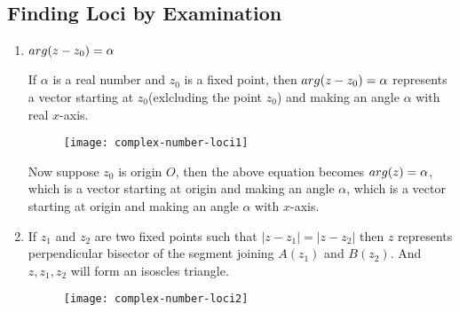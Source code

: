\subsection{Finding Loci by Examination}
\begin{enumerate}
\item $\\arg(z - z_0) = \alpha$

  If $\alpha$ is a real number and $z_0$ is a fixed point, then $\\arg(z - z_0) =\alpha$ represents a vector starting at
  $z_0$(exlcluding  the point $z_0$) and making an angle $\alpha$ with real $x$-axis.
  \begin{figure}[h]
    \begin{center}
      \texttt{[image: complex-number-loci1]}
    \end{center}
  \end{figure}

  Now suppose $z_0$ is origin $O$, then the above equation becomes $\\arg(z) = \alpha$, which is a vector starting at origin and
  making an angle $\alpha$, which is a vector starting at origin and making an angle $\alpha$ with $x$-axis.
\item If $z_1$ and $z_2$ are two fixed points such that $|z - z_1| = |z - z_2|$ then $z$ represents perpendicular bisector of the
  segment joining $A(z_1)$ and $B(z_2).$ And $z, z_1, z_2$ will form an isoscles triangle.
  \begin{figure}[h]
    \begin{center}
      \texttt{[image: complex-number-loci2]}
    \end{center}
  \end{figure}


\end{enumerate}
